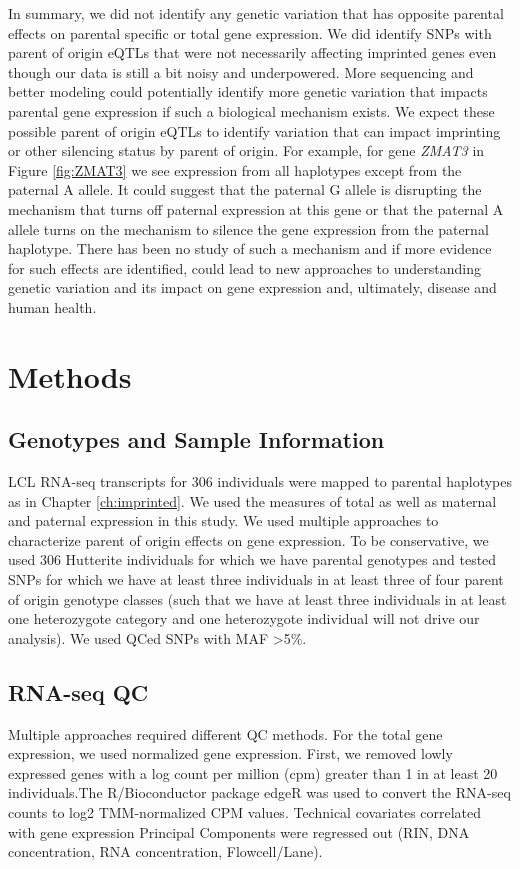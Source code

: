In summary, we did not identify any genetic variation that has opposite parental effects on parental specific or total gene expression. We did identify SNPs with parent of origin eQTLs that were not necessarily affecting imprinted genes even though our data is still a bit noisy and underpowered. More sequencing and better modeling could potentially identify more genetic variation that impacts parental gene expression if such a biological mechanism exists. We expect these possible parent of origin eQTLs to identify variation that can impact imprinting or other silencing status by parent of origin. For example, for gene \emph{ZMAT3} in Figure \ref{fig:ZMAT3} we see expression from all haplotypes except from the paternal A allele. It could suggest that the paternal G allele is disrupting the mechanism that turns off paternal expression at this gene or that the paternal A allele turns on the mechanism to silence the gene expression from the paternal haplotype. There has been no study of such a mechanism and if more evidence for such effects are identified, could lead to new approaches to understanding genetic variation and its impact on gene expression and, ultimately, disease and human health. 

\section{Methods}\label{ch04-methods}

\subsection{Genotypes and Sample Information}\label{Genotypes and Sample Information}
LCL RNA-seq transcripts for 306 individuals were mapped to parental haplotypes as in Chapter \ref{ch:imprinted}. We used the measures of total as well as maternal and paternal expression in this study. We used multiple approaches to characterize parent of origin effects on gene expression. To be conservative, we used 306 Hutterite individuals for which we have parental genotypes and tested SNPs for which we have at least three individuals in at least three of four parent of origin genotype classes (such that we have at least three individuals in at least one heterozygote category and one heterozygote individual will not drive our analysis). We used QCed SNPs with MAF \textgreater 5\%.

\subsection{RNA-seq QC}\label{RNA-seq QC}
Multiple approaches required different QC methods. For the total gene expression, we used normalized gene expression. First, we removed lowly expressed genes with a log count per million (cpm) greater than 1 in at least 20 individuals.The R/Bioconductor package edgeR was used to convert the RNA-seq counts to log2 TMM-normalized CPM values\cite{Robinson:2010dd,Robinson:2010cw}. Technical covariates correlated with gene expression Principal Components were regressed out (RIN, DNA concentration, RNA concentration, Flowcell/Lane). 

